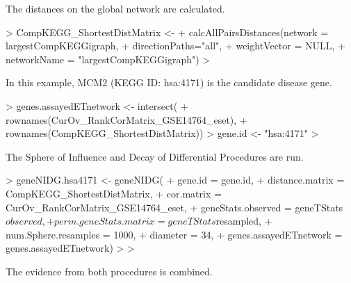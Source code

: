 \documentclass[11pt]{article}
\begin{document}

The distances on the global network are calculated.


\begin{Schunk}
\begin{Sinput}
> CompKEGG_ShortestDistMatrix <- 
+ calcAllPairsDistances(network = largestCompKEGGigraph,
+ 					     directionPaths="all",
+ 					     weightVector = NULL,
+ 					     networkName = "largestCompKEGGigraph")
> 
\end{Sinput}
\end{Schunk}



In this example, MCM2 (KEGG ID: hsa:4171) is the candidate disease gene. 

\begin{Schunk}
\begin{Sinput}
> genes.assayedETnetwork <- intersect(
+ 	rownames(CurOv_RankCorMatrix_GSE14764_eset),
+ 	rownames(CompKEGG_ShortestDistMatrix))
> gene.id <- "hsa:4171"
> 
\end{Sinput}
\end{Schunk}





The Sphere of Influence and Decay of Differential Procedures are run.


\begin{Schunk}
\begin{Sinput}
> geneNIDG.hsa4171 <-  geneNIDG(
+ 	gene.id = gene.id,
+ 	distance.matrix = CompKEGG_ShortestDistMatrix,
+ 	cor.matrix = CurOv_RankCorMatrix_GSE14764_eset,
+ 	geneStats.observed = geneTStats$observed,
+ 	perm.geneStats.matrix = geneTStats$resampled,
+ 	num.Sphere.resamples = 1000,
+ 	diameter = 34,
+ 	genes.assayedETnetwork = genes.assayedETnetwork)
> 
> 
\end{Sinput}
\end{Schunk}



The evidence from both procedures is combined. 


\begin{Schunk}
\end{Schunk}
\end{document}
